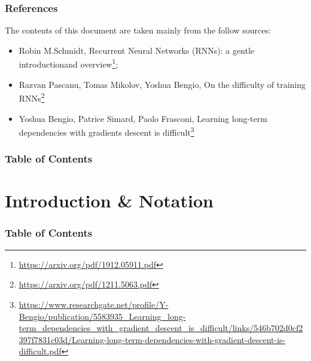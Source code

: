 \documentclass[
	11pt,
]{beamer}
\begin{document}
\begin{frame}
	\frametitle{References}
	The contents of this document are taken mainly from the follow sources:
	\begin{itemize}
		\item Robin M.Schmidt, Recurrent Neural Networks (RNNs): a gentle introductionand overview\footnote[1]{\url{https://arxiv.org/pdf/1912.05911.pdf}};
		\item Razvan Pascanu, Tomas Mikolov, Yoshua Bengio, On the difficulty of training RNNs\footnote[2]{\url{https://arxiv.org/pdf/1211.5063.pdf}}
		\item Yoshua Bengio, Patrice Simard, Paolo Frasconi, Learning long-term dependencies with gradients descent is difficult\footnote[3]{\url{https://www.researchgate.net/profile/Y-Bengio/publication/5583935_Learning_long-term_dependencies_with_gradient_descent_is_difficult/links/546b702d0cf2397f7831c03d/Learning-long-term-dependencies-with-gradient-descent-is-difficult.pdf}}
	\end{itemize}

\end{frame}
\begin{frame}
	\frametitle{Table of Contents} %
	
	\tableofcontents %
\end{frame}


\section{Introduction \& Notation} %
\begin{frame}
	\frametitle{Table of Contents}

	\tableofcontents[currentsection]
\end{frame}
\end{document}
